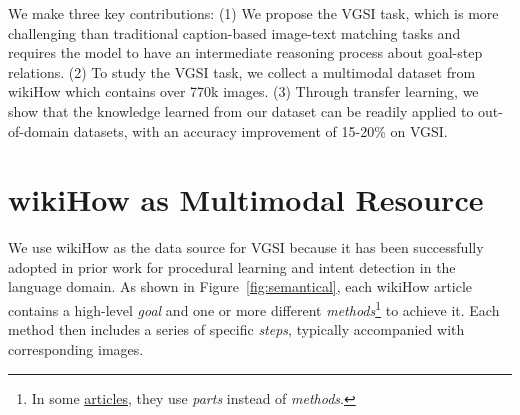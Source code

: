 \documentclass[11pt]{article}
\begin{document}
We make three key contributions: (1) We propose the VGSI task, which is more challenging than traditional caption-based image-text matching tasks and requires the model to have an intermediate reasoning process about goal-step relations.
(2) To study the VGSI task, we collect a multimodal dataset from wikiHow which contains over 770k images.
(3) Through transfer learning, we show that the knowledge learned from our dataset can be readily applied to out-of-domain datasets, with an accuracy improvement of 15-20\% on VGSI.

\section{wikiHow as Multimodal Resource}
We use wikiHow as the data source for VGSI because it has been successfully adopted in prior work for procedural learning \cite{zhou-etal-2019-learning-household} and intent detection \cite{zhang-etal-2020-intent} in the language domain. As shown in Figure~\ref{fig:semantical}, each wikiHow article contains a high-level \emph{goal} and one or more different \emph{methods}\footnote{In some \href{https://www.wikihow.com/Make-a-Shadow-Box}{articles}, they use \emph{parts} instead of \emph{methods}.} to achieve it. Each method then includes a series of specific \emph{steps}, typically accompanied with corresponding images.
\end{document}
